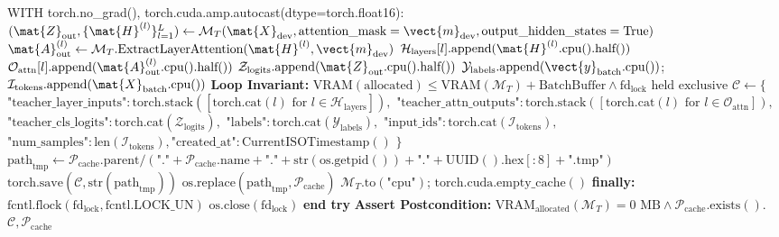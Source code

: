 \begin{algorithm}[H]
\begin{algorithmic}[1]
        \STATE WITH torch.no\_grad(), torch.cuda.amp.autocast(dtype=torch.float16):
            \STATE $(\mat{Z}_{\text{out}}, \{\mat{H}^{(l)}\}_{l=1}^L) \leftarrow \mathcal{M}_T(\mat{X}_{\text{dev}}, \text{attention\_mask}=\vect{m}_{\text{dev}}, \text{output\_hidden\_states}=\text{True})$
                \STATE $\mat{A}_{\text{out}}^{(l)} \leftarrow \mathcal{M}_T.\text{ExtractLayerAttention}(\mat{H}^{(l)}, \vect{m}_{\text{dev}})$
                \STATE $\mathcal{H}_{\text{layers}}[l].\text{append}(\mat{H}^{(l)}.\text{cpu}().\text{half}())$
                \STATE $\mathcal{O}_{\text{attn}}[l].\text{append}(\mat{A}_{\text{out}}^{(l)}.\text{cpu}().\text{half}())$
            \ENDFOR
            \STATE $\mathcal{Z}_{\text{logits}}.\text{append}(\mat{Z}_{\text{out}}.\text{cpu}().\text{half}())$
            \STATE $\mathcal{Y}_{\text{labels}}.\text{append}(\vect{y}_{\text{batch}}.\text{cpu}())$; $\mathcal{I}_{\text{tokens}}.\text{append}(\mat{X}_{\text{batch}}.\text{cpu}())$
        \STATE \textbf{Loop Invariant:} $\text{VRAM}(\text{allocated}) \le \text{VRAM}(\mathcal{M}_T) + \text{BatchBuffer} \land \text{fd}_{\text{lock}} \text{ held exclusive}$
    \ENDFOR
    \STATE {}
    \STATE $\mathcal{C} \leftarrow \{$
    \STATE \quad $\text{"teacher\_layer\_inputs"}: \text{torch.stack}([\text{torch.cat}(l) \text{ for } l \in \mathcal{H}_{\text{layers}}]),$
    \STATE \quad $\text{"teacher\_attn\_outputs"}: \text{torch.stack}([\text{torch.cat}(l) \text{ for } l \in \mathcal{O}_{\text{attn}}]),$
    \STATE \quad $\text{"teacher\_cls\_logits"}: \text{torch.cat}(\mathcal{Z}_{\text{logits}}),$
    \STATE \quad $\text{"labels"}: \text{torch.cat}(\mathcal{Y}_{\text{labels}}),$
    \STATE \quad $\text{"input\_ids"}: \text{torch.cat}(\mathcal{I}_{\text{tokens}}),$
    \STATE \quad $\text{"num\_samples"}: \text{len}(\mathcal{I}_{\text{tokens}}), \text{"created\_at"}: \text{CurrentISOTimestamp}()$
    \STATE $\}$
    \STATE $\text{path}_{\text{tmp}} \leftarrow \mathcal{P}_{\text{cache}}.\text{parent} / (\text{"."} + \mathcal{P}_{\text{cache}}.\text{name} + \text{"."} + \text{str}(\text{os.getpid}()) + \text{"."} + \text{UUID}().\text{hex}[:8] + \text{".tmp"})$
    \STATE $\text{torch.save}(\mathcal{C}, \text{str}(\text{path}_{\text{tmp}}))$
    \STATE $\text{os.replace}(\text{path}_{\text{tmp}}, \mathcal{P}_{\text{cache}})$ 
    \STATE $\mathcal{M}_T.\text{to}(\text{"cpu"})$; $\text{torch.cuda.empty\_cache}()$ 
\STATE \textbf{finally:}
    \STATE $\text{fcntl.flock}(\text{fd}_{\text{lock}}, \text{fcntl.LOCK\_UN})$ 
    \STATE $\text{os.close}(\text{fd}_{\text{lock}})$
\STATE \textbf{end try}
\STATE \textbf{Assert Postcondition:} $\text{VRAM}_{\text{allocated}}(\mathcal{M}_T) = 0\text{ MB} \land \mathcal{P}_{\text{cache}}.\text{exists}()$.
\RETURN $\mathcal{C}, \mathcal{P}_{\text{cache}}$
\end{algorithmic}
\end{algorithm}

